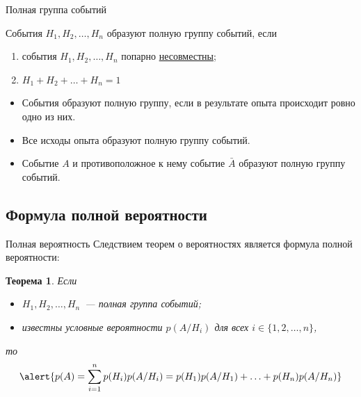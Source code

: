 \documentclass[unicode,11pt,notheorems,xcolor=table]{beamer}
\newtheorem{theorem}{Теорема}
\begin{document}
\begin{frame}{Полная группа событий}{}
    \begin{block}{}
        События $H_1, H_2,\ldots, H_n$ образуют \alert{полную группу событий}, если 
        \begin{enumerate}
            \item события \alert{$H_1, H_2,\ldots, H_n$} попарно \underline{несовместны};
            \item \alert{$H_1+H_2+\ldots+H_n = 1$}
        \end{enumerate}
    \end{block}

    \bigskip
    \begin{itemize}
        \item События образуют полную группу, если в результате опыта происходит ровно одно из них.
        \item Все исходы опыта образуют полную группу событий.
        \item Событие $A$ и противоположное к нему событие $\bar{A}$ образуют полную группу событий.
    \end{itemize}
\end{frame}

\subsection{Формула полной вероятности}

\begin{frame}{Полная вероятность}
    Следствием теорем о вероятностях   является формула полной вероятности:
    \begin{theorem}{}
        Если 
        \begin{itemize}
            \item $H_1,H_2,\ldots, H_n$~--- полная группа событий;
            \item известны условные вероятности $p(A/H_i)$ для всех $i\in \{1,2,\ldots,n\}$,
        \end{itemize}
        то
        $$
           \alert{p(A) = \sum_{i=1}^n p(H_i)p(A/H_i) =p(H_1)p(A/H_1)+ \ldots+p(H_n)p(A/H_n)}
        $$
    \end{theorem}
\end{frame}
\end{document}
